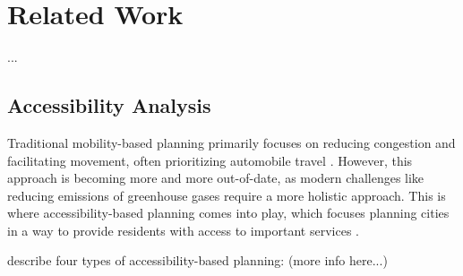 \clearpage
\section{Related Work}
\label{sec:related_work}

...

\subsection{Accessibility Analysis}
\label{subsec:accessibility_analysis}


Traditional mobility-based planning primarily focuses on reducing congestion and facilitating movement, often prioritizing automobile travel \cite{proffittAccessibilityPlanningAmerican2019}.
However, this approach is becoming more and more out-of-date, as modern challenges like reducing emissions of greenhouse gases require a more holistic approach.
This is where accessibility-based planning comes into play, which focuses planning cities in a way to provide residents with access to important services \cite{proffittAccessibilityPlanningAmerican2019}.

\cite{geursAccessibilityEvaluationLanduse2004a} describe four types of accessibility-based planning: (more info here...)


